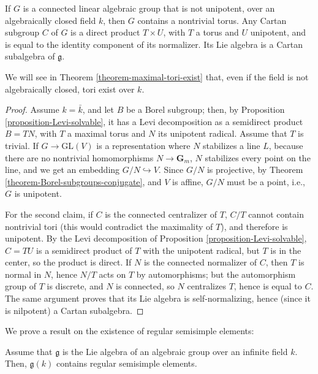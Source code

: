 \begin{proposition}
\label{proposition-unipotent-torus}
If $G$ is a connected linear algebraic group that is not unipotent, over an algebraically closed field $k$, then $G$ contains a nontrivial torus. Any Cartan subgroup $C$ of $G$ is a direct product $T\times U$, with $T$ a torus and $U$ unipotent, and is equal to the identity component of its normalizer. Its Lie algebra is a Cartan subalgebra of $\mathfrak g$.
\end{proposition}

We will see in Theorem \ref{theorem-maximal-tori-exist} that, even if the field is not algebraically closed, tori exist over $k$.

\begin{proof}
 Assume $k=\bar k$, and let $B$ be a Borel subgroup; then, by Proposition \ref{proposition-Levi-solvable}, it has a Levi decomposition as a semidirect product  $B=T N$, with $T$ a maximal torus and $N$ its unipotent radical. Assume that $T$ is trivial. If $G\to \text{GL}(V)$ is a representation where $N$ stabilizes a line $L$, because there are no nontrivial homomorphisms $N\to\mathbf{G}_m$, $N$ stabilizes every point on the line, and we get an embedding $G/N\hookrightarrow V$. Since $G/N$ is projective, by Theorem \ref{theorem-Borel-subgroups-conjugate}, and $V$ is affine, $G/N$ must be a point, i.e., $G$ is unipotent.
 
 For the second claim, if $C$ is the connected centralizer of $T$, $C/T$ cannot contain nontrivial tori (this would contradict the maximality of $T$), and therefore is unipotent. By the Levi decomposition of Proposition \ref{proposition-Levi-solvable}, $C=TU$ is a semidirect product of $T$ with the unipotent radical, but $T$ is in the center, so the product is direct. If $N$ is the connected normalizer of $C$, then $T$ is normal in $N$, hence $N/T$ acts on $T$ by automorphisms; but the automorphism group of $T$ is discrete, and $N$ is connected, so $N$ centralizes $T$, hence is equal to $C$. The same argument proves that its Lie algebra is self-normalizing, hence (since it is nilpotent) a Cartan subalgebra.
\end{proof}



We prove a result on the existence of regular semisimple elements:

\begin{lemma}
 \label{lemma-regular-semisimple-exist}
Assume that $\mathfrak g$ is the Lie algebra of an algebraic group over an infinite field $k$. Then, $\mathfrak g(k)$ contains regular semisimple elements. 
\end{lemma}

